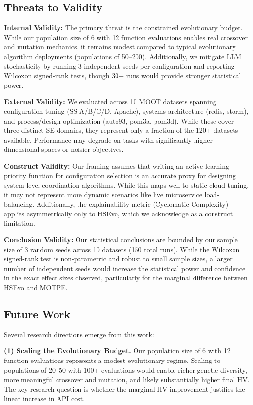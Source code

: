 \documentclass[sigconf,nonacm]{acmart}
\begin{document}
\subsection{Threats to Validity}

\textbf{Internal Validity:} The primary threat is the constrained evolutionary budget. While our population size of 6 with 12 function evaluations enables real crossover and mutation mechanics, it remains modest compared to typical evolutionary algorithm deployments (populations of 50--200). Additionally, we mitigate LLM stochasticity by running 3 independent seeds per configuration and reporting Wilcoxon signed-rank tests, though 30+ runs would provide stronger statistical power.

\textbf{External Validity:} We evaluated across 10 MOOT datasets spanning configuration tuning (SS-A/B/C/D, Apache), systems architecture (redis, storm), and process/design optimization (auto93, pom3a, pom3d). While these cover three distinct SE domains, they represent only a fraction of the 120+ datasets available. Performance may degrade on tasks with significantly higher dimensional spaces or noisier objectives.

\textbf{Construct Validity:} Our framing assumes that writing an active-learning priority function for configuration selection is an accurate proxy for designing system-level coordination algorithms. While this maps well to static cloud tuning, it may not represent more dynamic scenarios like live microservice load-balancing. Additionally, the explainability metric (Cyclomatic Complexity) applies asymmetrically only to HSEvo, which we acknowledge as a construct limitation.

\textbf{Conclusion Validity:} Our statistical conclusions are bounded by our sample size of 3 random seeds across 10 datasets (150 total runs). While the Wilcoxon signed-rank test is non-parametric and robust to small sample sizes, a larger number of independent seeds would increase the statistical power and confidence in the exact effect sizes observed, particularly for the marginal difference between HSEvo and MOTPE.

\subsection{Future Work}
Several research directions emerge from this work:

\textbf{(1) Scaling the Evolutionary Budget.} Our population size of 6 with 12 function evaluations represents a modest evolutionary regime. Scaling to populations of 20--50 with 100+ evaluations would enable richer genetic diversity, more meaningful crossover and mutation, and likely substantially higher final HV. The key research question is whether the marginal HV improvement justifies the linear increase in API cost.
\end{document}
